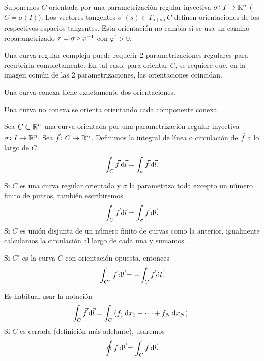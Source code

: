 \begin{obs}
    Suponemos $C$ orientada por una parametrización regular inyectiva $\sigma \colon I \to \mathbb{R}^n$ ($C = \sigma(I)$). Los vectores tangentes
    $\sigma^\prime(s) \in T_{\sigma(s)}C$ definen orientaciones de los respectivos espacios tangentes. Esta orientación no cambia si se usa
    un camino reparametrizado $\tau = \sigma \circ \varphi^{-1}$ con $\varphi^\prime > 0$.
\end{obs}

\begin{obs}
    Una curva regular compleja puede requerir 2 parametrizaciones regulares para recubrirla completamente. En tal caso, para orientar $C$, se
    requiere que, en la imagen común de las 2 parametrizaciones, las orientaciones coincidan.
\end{obs}
\begin{example}
    Una curva conexa tiene exactamente dos orientaciones.
\end{example}
\begin{example}
    Una curva no conexa se orienta orientando cada componente conexa.
\end{example}

\begin{defi}
    Sea $C \subset \mathbb{R}^n$ una curva orientada por una parametrización regular inyectiva $\sigma \colon I \to \mathbb{R}^n$. Sea $\vec{f} \colon C \to \mathbb{R}^n$.
    Definimos la integral de línea o circulación de $\vec{f}$ a lo largo de $C$
    \[
        \int_C \vec{f} \dif \vec{l} = \int_\sigma \vec{f} \dif \vec{l}.
    \]
\end{defi}
\begin{obs}
    Si $C$ es una curva regular orientada y $\sigma$ la parametriza toda excepto un número finito de puntos, tambi\'en escribiremos
    \[
        \int_C \vec{f} \dif \vec{l} = \int_\sigma \vec{f} \dif \vec{l}.
    \]
    Si $C$ es unión disjunta de un número finito de curvas como la anterior, igualmente calculamos la circulación al largo de cada una y sumamos.
\end{obs}

\begin{obs}
    Si $C^\circ$ es la curva $C$ con orientación opuesta, entonces
    \[
        \int_{C^\circ} \vec{f} \dif \vec{l} = - \int_C \vec{f} \dif \vec{l}.
    \]
\end{obs}

\begin{obs}
    Es habitual usar la notación
    \[
        \int_C \vec{f} \dif \vec{l} =  \int_C \left( f_1 \dif x_1 + \cdots + f_N \dif x_N \right).
    \]
    Si $C$ es cerrada (definición más adelante), usaremos
    \[
        \oint \vec{f} \dif \vec{l} = \int_C \vec{f} \dif \vec{l}.
    \]
\end{obs}

